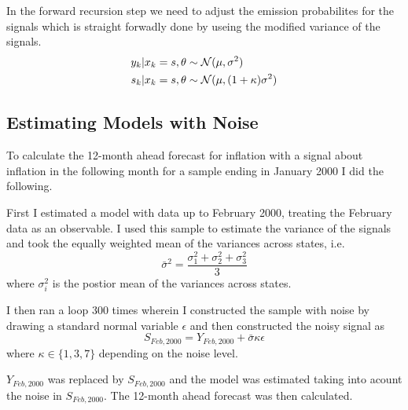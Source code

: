 \documentclass[12pt]{article}
\begin{document}
In the forward recursion step we need to adjust the emission probabilites for the signals
which is straight forwadly done by useing the modified variance of the signals.
\begin{align*}
  y_k | x_k = s, \theta &\sim  \operatorname{\mathcal{N}}( \mu , \sigma^2)\\
  s_k | x_k = s, \theta &\sim  \operatorname{\mathcal{N}}( \mu , (1+\kappa)\sigma^2)
\end{align*}

\subsection*{Estimating Models with Noise}

To calculate the 12-month ahead forecast for inflation with a signal about inflation in the 
following month for a sample ending in January 2000 I did the following. 

First I estimated a model with data up to February 2000, treating the February data as an 
observable. I used this sample to estimate the variance of the signals and took the equally weighted
mean of the variances across states, i.e.
\[
  \bar{\sigma}^2 = \frac{\sigma^2_1 + \sigma^2_2 + \sigma^2_3}{3}  
\]
where $\sigma^2_i$ is the postior mean of the variances across states. 

I then ran a loop 300 times wherein I constructed the sample with noise by drawing a
standard normal variable $\epsilon$ and then constructed the noisy signal as 
\[
  S_{Feb, 2000} = Y_{Feb, 2000} + \bar{\sigma} \kappa \epsilon
\]
where $\kappa \in \{1, 3, 7\}$ depending on the noise level.

$Y_{Feb, 2000}$ was replaced by $S_{Feb, 2000}$ and the model was estimated taking into acount
the noise in $S_{Feb, 2000}$. The 12-month ahead forecast was then calculated. 
\end{document}
